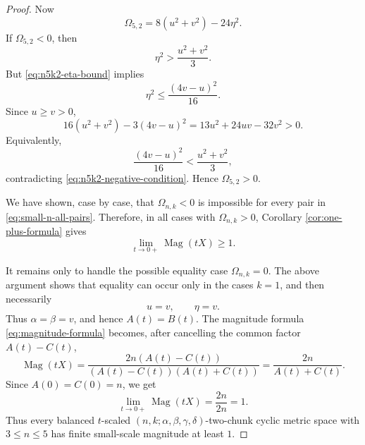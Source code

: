 \documentclass[10pt,a4paper]{amsart}
\DeclareMathOperator{\Mag}{Mag}
\begin{document}
\begin{proof}
Now
\begin{equation}\label{eq:n5k2-Omega}
\Omega_{5,2}=8(u^2+v^2)-24\eta^2.
\end{equation}
If \(\Omega_{5,2}<0\), then
\begin{equation}\label{eq:n5k2-negative-condition}
\eta^2>\frac{u^2+v^2}{3}.
\end{equation}
But \eqref{eq:n5k2-eta-bound} implies
\begin{equation}\label{eq:n5k2-upper-square}
\eta^2\leq \frac{(4v-u)^2}{16}.
\end{equation}
Since \(u\geq v>0\),
\begin{equation}\label{eq:n5k2-elementary-positive}
16(u^2+v^2)-3(4v-u)^2
=
13u^2+24uv-32v^2
>0.
\end{equation}
Equivalently,
\begin{equation}\label{eq:n5k2-contradiction}
\frac{(4v-u)^2}{16}
<
\frac{u^2+v^2}{3},
\end{equation}
contradicting \eqref{eq:n5k2-negative-condition}.  Hence
\(\Omega_{5,2}>0\).

We have shown, case by case, that \(\Omega_{n,k}<0\) is impossible for every
pair in \eqref{eq:small-n-all-pairs}.  Therefore, in all cases with
\(\Omega_{n,k}>0\), Corollary \ref{cor:one-plus-formula} gives
\[
\lim_{t\to 0+}\Mag(tX)\geq 1.
\]

It remains only to handle the possible equality case \(\Omega_{n,k}=0\).
The above argument shows that equality can occur only in the cases \(k=1\),
and then necessarily
\begin{equation}\label{eq:k1-equality-case}
u=v,
\qquad
\eta=v.
\end{equation}
Thus \(\alpha=\beta=v\), and hence \(A(t)=B(t)\).  The magnitude formula
\eqref{eq:magnitude-formula} becomes, after cancelling the common factor
\(A(t)-C(t)\),
\begin{equation}\label{eq:k1-degenerate-cancellation}
\Mag(tX)
=
\frac{2n(A(t)-C(t))}{(A(t)-C(t))(A(t)+C(t))}
=
\frac{2n}{A(t)+C(t)}.
\end{equation}
Since \(A(0)=C(0)=n\), we get
\begin{equation}\label{eq:k1-degenerate-limit-final}
\lim_{t\to 0+}\Mag(tX)
=
\frac{2n}{2n}
=
1.
\end{equation}
Thus every balanced \(t\)-scaled \((n,k;\alpha,\beta,\gamma,\delta)\)-two-chunk cyclic metric space with
\(3\leq n\leq 5\) has finite small-scale magnitude at least \(1\).
\end{proof}
\end{document}

